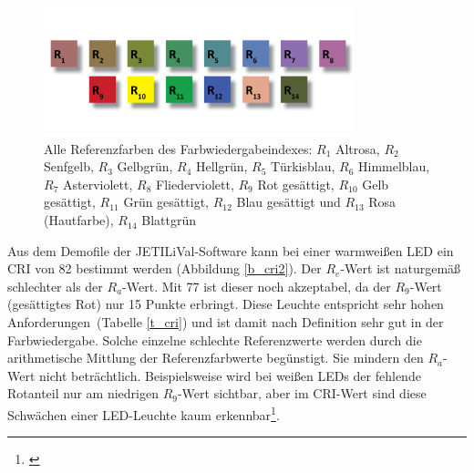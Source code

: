 \begin{figure}[H]     %
\centering
\includegraphics[width=0.8\textwidth]{bilder/cri} 
\caption {Alle Referenzfarben des Farbwiedergabeindexes: $R_{1}$ Altrosa, $R_{2}$ Senfgelb, $R_{3}$ Gelbgrün, $R_{4}$ Hellgrün, $R_{5}$ Türkisblau, $R_{6}$ Himmelblau, $R_{7}$ Asterviolett, $R_{8}$ Fliederviolett, $R_{9}$ Rot gesättigt, $R_{10}$ Gelb gesättigt, $R_{11}$ Grün gesättigt, $R_{12}$ Blau gesättigt und $R_{13}$ Rosa (Hautfarbe), $R_{14}$ Blattgrün\protect\footnotemark}\label{b_cri}
\end{figure}


\noindent Aus dem Demofile der JETI\glqq LiVal\grqq -Software kann bei einer warmweißen LED ein CRI von 82 bestimmt werden (Abbildung \ref{b_cri2}). Der $R_{e}$-Wert ist naturgemäß schlechter als der $R_{a}$-Wert. Mit 77 ist dieser noch akzeptabel, da der $R_{9}$-Wert (gesättigtes Rot) nur 15 Punkte erbringt. Diese Leuchte entspricht \glqq sehr hohen Anforderungen\grqq\ (Tabelle \ref{t_cri}) und ist damit nach Definition sehr gut in der Farbwiedergabe. Solche einzelne schlechte Referenzwerte werden durch die arithmetische Mittlung der Referenzfarbwerte begünstigt. Sie mindern den $R_{a}$-Wert nicht beträchtlich. Beispielsweise wird bei weißen LEDs der fehlende Rotanteil nur am niedrigen $R_{9}$-Wert sichtbar, aber im CRI-Wert sind diese Schwächen einer LED-Leuchte kaum erkennbar\footnote{\cite{davis_ohno}}. 

